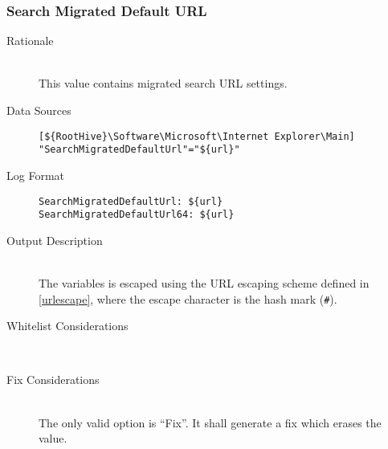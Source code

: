 \subsubsection{Search Migrated Default URL}
\begin{description}
\item[Rationale]  \hfill \\ This value contains migrated search URL settings.

\item[Data Sources] \hfill
\vspace{-\baselineskip}
\begin{verbatim}
[${RootHive}\Software\Microsoft\Internet Explorer\Main]
"SearchMigratedDefaultUrl"="${url}"
\end{verbatim}
\item[Log Format] \hfill
\vspace{-\baselineskip}
\begin{verbatim} 
SearchMigratedDefaultUrl: ${url}
SearchMigratedDefaultUrl64: ${url}
\end{verbatim}
\item[Output Description] \hfill \\
The variables  is escaped using the URL escaping
scheme defined in \ref{urlescape}, where the escape character is the hash mark
(\verb|#|).
\item[Whitelist Considerations] \hfill \\

\item[Fix Considerations] \hfill \\
The only valid option is ``Fix''. It shall generate a fix which erases the value.
\end{description}

